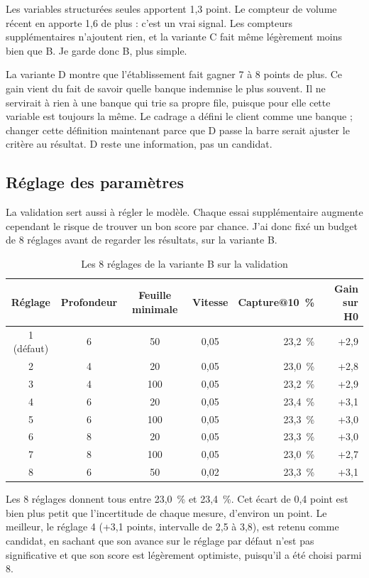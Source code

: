 \documentclass[11pt,a4paper]{article}
\begin{document}
Les variables structurées seules apportent 1,3 point. Le compteur de volume récent en apporte 1,6 de plus : c'est un vrai signal. Les compteurs supplémentaires n'ajoutent rien, et la variante C fait même légèrement moins bien que B. Je garde donc B, plus simple.

La variante D montre que l'établissement fait gagner 7 à 8 points de plus. Ce gain vient du fait de savoir quelle banque indemnise le plus souvent. Il ne servirait à rien à une banque qui trie sa propre file, puisque pour elle cette variable est toujours la même. Le cadrage a défini le client comme une banque ; changer cette définition maintenant parce que D passe la barre serait ajuster le critère au résultat. D reste une information, pas un candidat.

\subsection{Réglage des paramètres}

La validation sert aussi à régler le modèle. Chaque essai supplémentaire augmente cependant le risque de trouver un bon score par chance. J'ai donc fixé un budget de 8 réglages avant de regarder les résultats, sur la variante B.

\begin{table}[H]
\centering\small
\begin{tabular}{@{}c c c c r r@{}}
\toprule
Réglage & Profondeur & Feuille minimale & Vitesse & Capture@10~\% & Gain sur H0 \\
\midrule
1 (défaut) & 6 & 50 & 0,05 & 23,2~\% & +2,9 \\
2 & 4 & 20 & 0,05 & 23,0~\% & +2,8 \\
3 & 4 & 100 & 0,05 & 23,2~\% & +2,9 \\
4 & 6 & 20 & 0,05 & 23,4~\% & +3,1 \\
5 & 6 & 100 & 0,05 & 23,3~\% & +3,0 \\
6 & 8 & 20 & 0,05 & 23,3~\% & +3,0 \\
7 & 8 & 100 & 0,05 & 23,0~\% & +2,7 \\
8 & 6 & 50 & 0,02 & 23,3~\% & +3,1 \\
\bottomrule
\end{tabular}
\caption{Les 8 réglages de la variante B sur la validation}
\end{table}

Les 8 réglages donnent tous entre 23,0~\% et 23,4~\%. Cet écart de 0,4 point est bien plus petit que l'incertitude de chaque mesure, d'environ un point. Le meilleur, le réglage 4 (+3,1 points, intervalle de 2,5 à 3,8), est retenu comme candidat, en sachant que son avance sur le réglage par défaut n'est pas significative et que son score est légèrement optimiste, puisqu'il a été choisi parmi 8.
\end{document}
